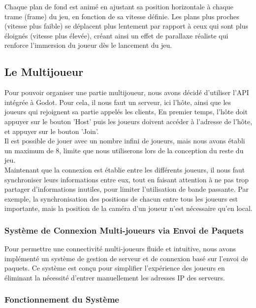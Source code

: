 Chaque plan de fond est animé en ajustant sa position horizontale à chaque trame (frame) du jeu, en fonction de sa vitesse définie.
Les plans plus proches (vitesse plus faible) se déplacent plus lentement par rapport à ceux qui sont plus éloignés (vitesse plus élevée),
créant ainsi un effet de parallaxe réaliste qui renforce l'immersion du joueur dès le lancement du jeu.

\subsection{Le Multijoueur}

Pour pouvoir organiser une partie multijoueur, nous avons décidé d'utiliser l'API intégrée à Godot.
Pour cela, il nous faut un serveur, ici l'hôte, ainsi que les joueurs qui rejoignent sa partie appelés les clients,
En premier temps, l'hôte doit appuyer sur le bouton 'Host' puis les joueurs doivent accéder à l'adresse de l'hôte, et appuyer sur le bouton 'Join'.
\\

Il est possible de jouer avec un nombre infini de joueurs, mais nous avons établi un maximum de 8, limite que nous utiliserons lors de la conception du reste du jeu.
\\

Maintenant que la connexion est établie entre les différents joueurs, il nous faut synchroniser leurs informations entre eux,
tout en faisant attention à ne pas trop partager d'informations inutiles, pour limiter l'utilisation de bande passante.
Par exemple, la synchronisation des positions de chacun entre tous les joueurs est importante,
mais la position de la caméra d'un joueur n'est nécessaire qu'en local.

\subsubsection{Système de Connexion Multi-joueurs via Envoi de Paquets}

Pour permettre une connectivité multi-joueurs fluide et intuitive, nous avons implémenté un système de gestion de serveur et de connexion basé sur l'envoi de paquets.
Ce système est conçu pour simplifier l'expérience des joueurs en éliminant la nécessité d'entrer manuellement les adresses IP des serveurs.

\subsubsection{Fonctionnement du Système}

